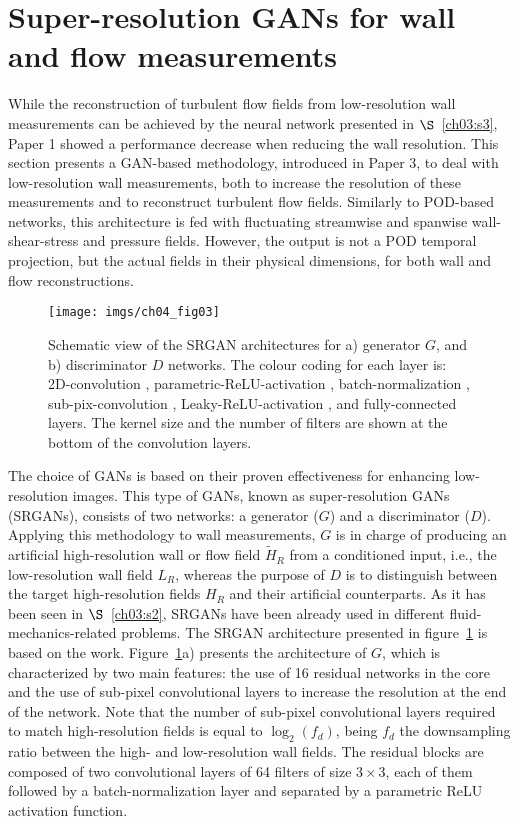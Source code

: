 \section{Super-resolution GANs for wall and flow measurements}\label{ch03:s4}
While the reconstruction of turbulent flow fields from low-resolution wall measurements can be achieved by the neural network presented in $\S$~\ref{ch03:s3}, Paper 1 showed a performance decrease when reducing the wall resolution.
This section presents a GAN-based methodology, introduced in Paper 3, to deal with low-resolution wall measurements, both to increase the resolution of these measurements and to reconstruct turbulent flow fields.
Similarly to POD-based networks, this architecture is fed with fluctuating streamwise and spanwise wall-shear-stress and pressure fields.
However, the output is not a POD temporal projection, but the actual fields in their physical dimensions, for both wall and flow reconstructions.
\begin{figure}
  \centering
  \texttt{[image: imgs/ch04\_fig03]}
  \caption{\label{ch04:fig03}Schematic view of the SRGAN architectures for a) generator $G$, and b) discriminator $D$ networks. The colour coding for each layer is: 2D-convolution , parametric-ReLU-activation , batch-normalization , sub-pix-convolution , Leaky-ReLU-activation , and fully-connected  layers. The kernel size and the number of filters are shown at the bottom of the convolution layers.}
\end{figure}

The choice of GANs is based on their proven effectiveness for enhancing low-resolution images.
This type of GANs, known as super-resolution GANs (SRGANs), consists of two networks: a generator ($G$) and a discriminator ($D$).
Applying this methodology to wall measurements, $G$ is in charge of producing an artificial high-resolution wall or flow field $\tilde{H}_R$ from a conditioned input, i.e., the low-resolution wall field $L_R$, whereas the purpose of $D$ is to distinguish between the target high-resolution fields $H_R$ and their artificial counterparts.
As it has been seen in $\S$~\ref{ch03:s2}, SRGANs have been already used in different fluid-mechanics-related problems.
The SRGAN architecture presented in figure~\ref{ch04:fig03} is based on the \citet{ledig2017photo} work.
Figure~\ref{ch04:fig03}a) presents the architecture of $G$, which is characterized by two main features: the use of 16 residual networks \citep{he2016deep} in the core and the use of sub-pixel convolutional layers \citep{shi2016real} to increase the resolution at the end of the network.
Note that the number of sub-pixel convolutional layers required to match high-resolution fields is equal to $\log_2(f_d)$, being $f_d$ the downsampling ratio between the high- and low-resolution wall fields.
The residual blocks are composed of two convolutional layers of 64 filters of size $3\times3$, each of them followed by a batch-normalization layer \citep{ioffe2015batch} and separated by a parametric ReLU \citep{he2015delving} activation function.

